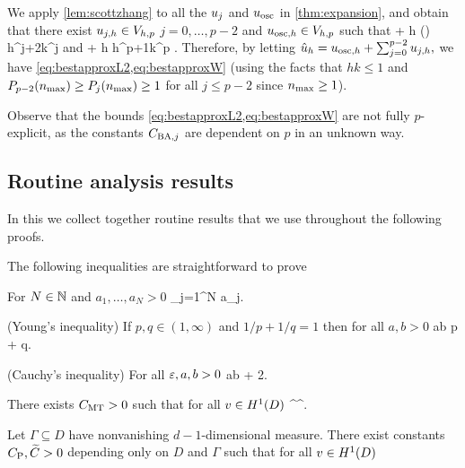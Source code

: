 
We apply \cref{lem:scottzhang} to all the $u_{j}$ and $u_{\mathrm{osc}}$ in \cref{thm:expansion}, and obtain that there exist $u_{j,h} \in V_{h,p}$ $j=0,\ldots,p-2$ and $u_{\mathrm{osc},h} \in V_{h,p}$ such that 
\beqs
\NLtD{\usj - \ujh} + h\NHoD{\usj - \ujh} \leq {}  \Pj\mleft(\nmax\mright) h^{j+2}k^j \Cfg
\eeqs
and
\beqs
\NLtD{\uosc - \uosch} + h\NHoD{\uosc - \uosch} \leq {} \Cosc\CAnk h^{p+1}k^p \Cfg.
\eeqs
Therefore, by letting $\hat{u}_{h} = u_{\mathrm{osc},h} + \sum_{j=0}^{p-2} u_{j,h},$ we have \cref{eq:bestapproxL2,eq:bestapproxW} (using the facts that $hk \leq 1$ and $P_{p-2}(n_{\max}) \geq P_{j}(n_{\max}) \geq 1$ for all $j \leq p-2$ since $n_{\max} \geq 1$).
\epf

Observe that the bounds \cref{eq:bestapproxL2,eq:bestapproxW} are not fully $p$-explicit, as the constants $C_{\mathrm{BA},j}$ are dependent on $p$ in an unknown way.

\subsection{Routine analysis results}\label{sec:anbackground}
In this  we collect together routine results that we use throughout the following proofs.

The following inequalities are straightforward to prove
\bit
\item For $N \in \mathbb N$ and $a_1,\ldots,a_N > 0$
\beq\label{eq:simple}
 \leq \sum_{j=1}^N a_j.
\eeq
\item (Young's inequality) If $p,q \in (1,\infty)$ and $1/p + 1/q = 1$ then for all $a,b > 0$
  \beq\label{eq:young}
ab \leq {}p + q.
\eeq
\item (Cauchy's inequality) For all $\varepsilon,a,b > 0$
  \beq\label{eq:cauchy}
  ab \leq {} + 2.
\eeq
  \eit
  




\label{thm:multiplicativetrace}%
There exists $C_{\mathrm{MT}} > 0$ such that for all $v \in \HoD$
\beqs
{} \leq \CMT {}^\half {}^\half.
\eeqs
\enth

\label{lem:poincare}
Let $\Gamma \subseteq D$ have nonvanishing $d-1$-dimensional measure. There exist constants $C_{\mathrm{P}},\widetilde{C} > 0$ depending only on $D$ and $\Gamma$ such that for all $v \in \HoD$

